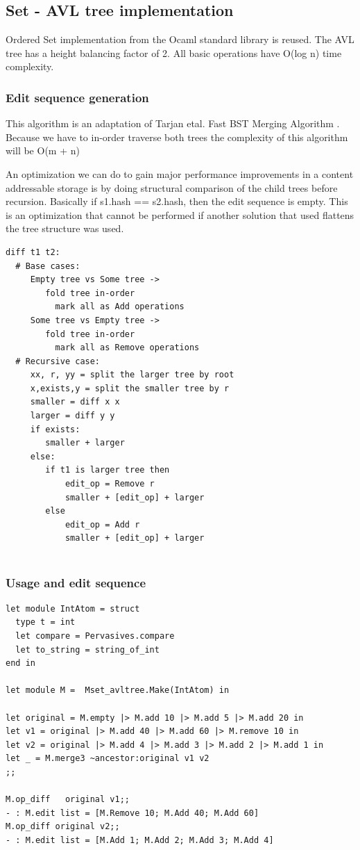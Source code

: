 \documentclass{article}
\begin{document}
\subsection{Set - AVL tree implementation}
Ordered Set implementation from the Ocaml standard library is reused. The AVL tree has a height balancing factor of 2. All basic operations have O(log n) time complexity.
\subsubsection{Edit sequence generation}\label{set-avlt-diff}
This algorithm is an adaptation of Tarjan etal. Fast BST Merging Algorithm \cite{}. Because we have to in-order traverse both trees the complexity of this algorithm will be O(m + n)

An optimization we can do to gain major performance improvements in a content addressable storage is by doing structural comparison of the child trees before recursion. Basically if s1.hash == s2.hash, then the edit sequence is empty. This is an optimization that cannot be performed if another solution that used flattens the tree structure was used.

\begin{lstlisting}
diff t1 t2:
  # Base cases:
     Empty tree vs Some tree -> 
     	fold tree in-order 
     	  mark all as Add operations
     Some tree vs Empty tree ->
     	fold tree in-order 
     	  mark all as Remove operations
  # Recursive case:
     xx, r, yy = split the larger tree by root
     x,exists,y = split the smaller tree by r
     smaller = diff x x
  	 larger = diff y y
     if exists: 
     	smaller + larger
     else:
     	if t1 is larger tree then 
        	edit_op = Remove r
            smaller + [edit_op] + larger
        else 
        	edit_op = Add r
        	smaller + [edit_op] + larger
        
\end{lstlisting}

\subsubsection{Usage and edit sequence}
\begin{lstlisting}
let module IntAtom = struct
  type t = int
  let compare = Pervasives.compare
  let to_string = string_of_int
end in

let module M =  Mset_avltree.Make(IntAtom) in

let original = M.empty |> M.add 10 |> M.add 5 |> M.add 20 in
let v1 = original |> M.add 40 |> M.add 60 |> M.remove 10 in
let v2 = original |> M.add 4 |> M.add 3 |> M.add 2 |> M.add 1 in
let _ = M.merge3 ~ancestor:original v1 v2
;;

M.op_diff	original v1;;
- : M.edit list = [M.Remove 10; M.Add 40; M.Add 60]
M.op_diff original v2;;
- : M.edit list = [M.Add 1; M.Add 2; M.Add 3; M.Add 4]
\end{lstlisting}
\end{document}
